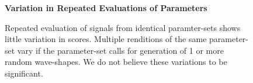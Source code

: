 \documentclass[\main/thesis.tex]{subfiles}
\begin{document}
\begin{figure}[htbp!]
\begin{center}
    \textbf{ Variation in Repeated Evaluations of Parameters }\par\medskip

    
\end{center}

\caption{Repeated evaluation of signals from identical paramter-sets shows little variation in scores. Multiple renditions of the same parameter-set vary if the parameter-set calls for generation of 1 or more random wave-shapes. We do not believe these variations to be significant.}
\label{fig:synth_deterministic}
\end{figure}
\end{document}
